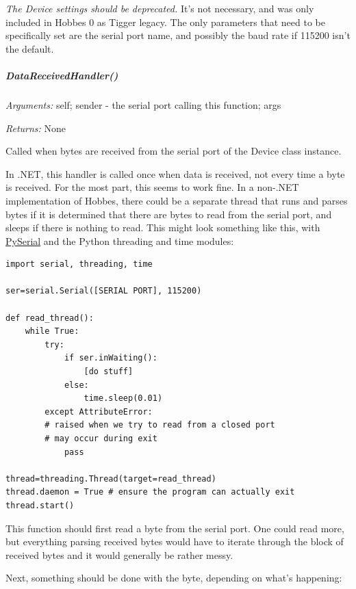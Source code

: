 \documentclass[12pt,letterpaper]{article}
\begin{document}
\emph{The Device settings should be deprecated.} It's not necessary, and was only included in Hobbes 0 as Tigger legacy. The only parameters that need to be specifically set are the serial port name, and possibly the baud rate if 115200 isn't the default.



%
%
\subparagraph{DataReceivedHandler()}
\label{4.3.1.2.2}

\emph{Arguments:} self; sender - the serial port calling this function; args

\emph{Returns:} None

Called when bytes are received from the serial port of the Device class instance.

In .NET, this handler is called once when data is received, not every time a byte is received. For the most part, this seems to work fine. In a non-.NET implementation of Hobbes, there could be a separate thread that runs and parses bytes if it is determined that there are bytes to read from the serial port, and sleeps if there is nothing to read. This might look something like this, with \href{http://pyserial.sourceforge.net/}{PySerial} and the Python threading and time modules:

\selectfont

\begin{lstlisting}
import serial, threading, time

ser=serial.Serial([SERIAL PORT], 115200)

def read_thread():
    while True:
        try:
            if ser.inWaiting():
                [do stuff]
            else:
                time.sleep(0.01)
        except AttributeError:
        # raised when we try to read from a closed port
        # may occur during exit
            pass

thread=threading.Thread(target=read_thread)
thread.daemon = True # ensure the program can actually exit
thread.start()
\end{lstlisting}

\selectfont

This function should first read a byte from the serial port. One could read more, but everything parsing received bytes would have to iterate through the block of received bytes and it would generally be rather messy.

Next, something should be done with the byte, depending on what's happening:
\end{document}
